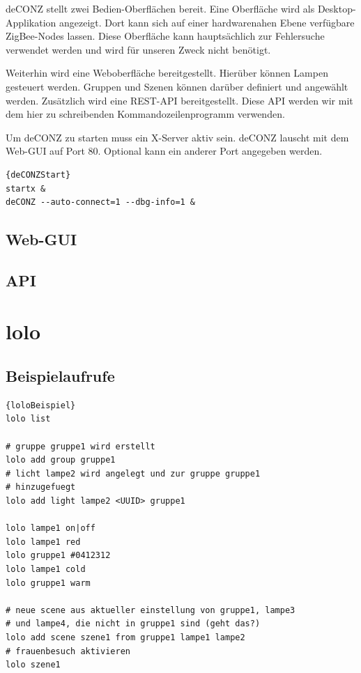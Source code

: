 \documentclass[a4paper,12pt]{article}
\begin{document}
deCONZ stellt zwei Bedien-Oberflächen bereit. Eine Oberfläche wird als Desktop-
Applikation angezeigt. Dort kann sich auf einer hardwarenahen Ebene verfügbare
ZigBee-Nodes lassen. Diese Oberfläche kann hauptsächlich zur Fehlersuche
verwendet werden und wird für unseren Zweck nicht benötigt.

Weiterhin wird eine Weboberfläche bereitgestellt. Hierüber können Lampen
gesteuert werden. Gruppen und Szenen können darüber definiert und angewählt
werden. Zusätzlich wird eine REST-API bereitgestellt. Diese API werden
wir mit dem hier zu schreibenden Kommandozeilenprogramm verwenden.

Um deCONZ zu starten muss ein X-Server aktiv sein. deCONZ lauscht mit dem
Web-GUI auf Port 80. Optional kann ein anderer Port angegeben werden.

\begin{lstlisting}[caption=deCONZ starten]{deCONZStart}
startx &
deCONZ --auto-connect=1 --dbg-info=1 &
\end{lstlisting}

\subsection{Web-GUI}
\subsection{API}

\section{lolo}

\subsection{Beispielaufrufe}

\begin{lstlisting}[caption=lolo Beispielaufrufe]{loloBeispiel}
lolo list

# gruppe gruppe1 wird erstellt
lolo add group gruppe1
# licht lampe2 wird angelegt und zur gruppe gruppe1
# hinzugefuegt
lolo add light lampe2 <UUID> gruppe1

lolo lampe1 on|off
lolo lampe1 red
lolo gruppe1 #0412312
lolo lampe1 cold
lolo gruppe1 warm

# neue scene aus aktueller einstellung von gruppe1, lampe3
# und lampe4, die nicht in gruppe1 sind (geht das?)
lolo add scene szene1 from gruppe1 lampe1 lampe2
# frauenbesuch aktivieren
lolo szene1
\end{lstlisting}
\end{document}
